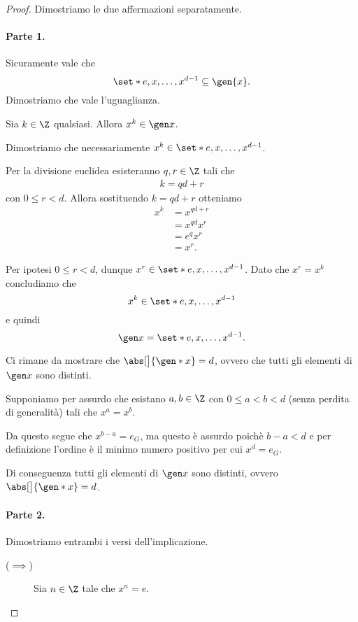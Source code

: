 \begin{proof}
    Dimostriamo le due affermazioni separatamente. 
    
    \paragraph{Parte 1.} Sicuramente vale che \[
        \set*{e, x, \dots, x^{d-1}} \subseteq \gen{x}.    
    \] Dimostriamo che vale l'uguaglianza.

    Sia $k \in \Z$ qualsiasi. Allora $x^k \in \gen x$. 
    
    Dimostriamo che necessariamente $x^k \in \set*{e, x, \dots, x^{d-1}}$.

    Per la divisione euclidea esisteranno $q, r \in \Z$ tali che \begin{align*}
        k = qd + r
    \end{align*} con $0 \leq r < d$. Allora sostituendo $k = qd+r$ otteniamo \begin{align*}
        x^k &= x^{qd + r}\\
        &= x^{qd}x^r\\
        &= e^qx^r\\
        &= x^r.
    \end{align*}
    
    Per ipotesi $0 \leq r < d$, dunque $x^r \in \set*{e, x, \dots, x^{d-1}}$. Dato che $x^r = x^k$ concludiamo che \[
        x^k \in \set*{e, x, \dots, x^{d-1}}    
    \] e quindi \[
        \gen x = \set*{e, x, \dots, x^{d-1}}.    
    \]

    Ci rimane da mostrare che $\abs[\big]{\gen* x} = d$, ovvero che tutti gli elementi di $\gen x$ sono distinti. 

    Supponiamo per assurdo che esistano $a, b \in \Z$ con $0 \leq a < b < d$ (senza perdita di generalità) tali che $x^a = x^b$.

    Da questo segue che $x^{b-a} = e_G$, ma questo è assurdo poichè $b-a < d$ e per definizione l'ordine è il minimo numero positivo per cui $x^d = e_G$.

    Di conseguenza tutti gli elementi di $\gen x$ sono distinti, ovvero $\abs[\big]{\gen* x} = d$.

    \paragraph{Parte 2.} Dimostriamo entrambi i versi dell'implicazione.
    \begin{description}
        \item[($\implies$)] Sia $n \in \Z$ tale che $x^n = e$.
        

\end{description}
\end{proof}
